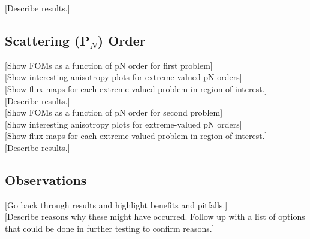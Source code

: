 [Describe results.] \\

\subsection{Scattering (P$_N$) Order}
\label{subsec:pnorder}
[Show FOMs as a function of pN order for first problem] \\

[Show interesting anisotropy plots for extreme-valued pN orders] \\

[Show flux maps for each extreme-valued problem in region of interest.] \\

[Describe results.] \\

[Show FOMs as a function of pN order for second problem] \\

[Show interesting anisotropy plots for extreme-valued pN orders] \\

[Show flux maps for each extreme-valued problem in region of interest.] \\

[Describe results.] \\

\subsection{Observations}
\label{subsec:observations}

[Go back through results and highlight benefits and pitfalls.] \\

[Describe reasons why these might have occurred. Follow up with a list of options
that could be done in further testing to confirm reasons.] \\
